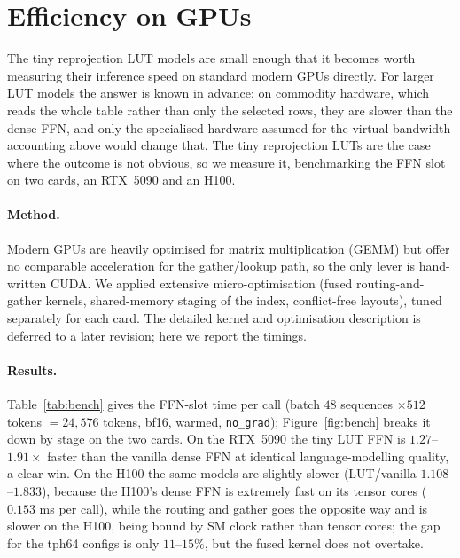 \documentclass[11pt]{article}
\begin{document}
\clearpage
\section{Efficiency on GPUs}
\label{sec:gpu}

The tiny reprojection LUT models are small enough that it becomes worth measuring their inference
speed on standard modern GPUs directly. For larger LUT models the answer is known in advance: on commodity hardware,
which reads the whole table rather than only the selected rows, they are slower than the dense FFN,
and only the specialised hardware assumed for the virtual-bandwidth accounting above would change
that. The tiny reprojection LUTs are the case where the outcome is not obvious, so we measure it,
benchmarking the FFN slot on two cards, an RTX~5090 and an H100.

\paragraph{Method.} Modern GPUs are heavily optimised for matrix multiplication (GEMM) but offer
no comparable acceleration for the gather/lookup path, so the only lever is hand-written CUDA. We
applied extensive micro-optimisation (fused routing-and-gather kernels, shared-memory staging
of the index, conflict-free layouts), tuned separately for each card. The detailed kernel and
optimisation description is deferred to a later revision; here we report the timings.

\paragraph{Results.} Table~\ref{tab:bench} gives the FFN-slot time per call (batch $48$ sequences
$\times512$ tokens $=24{,}576$ tokens, bf16, warmed, \texttt{no\_grad}); Figure~\ref{fig:bench}
breaks it down by stage on the two cards. On the RTX~5090 the tiny LUT FFN
is $1.27$--$1.91\times$ faster than the vanilla dense FFN at identical language-modelling quality,
a clear win. On the H100 the same models are slightly slower (LUT/vanilla $1.108$--$1.833$),
because the H100's dense FFN is extremely fast on its tensor cores ($0.153$ ms per call), while
the routing and gather goes the opposite way and is slower on the H100, being bound by SM clock
rather than tensor cores; the gap for the tph64 configs is only $11$--$15\%$, but the fused kernel
does not overtake.
\end{document}
